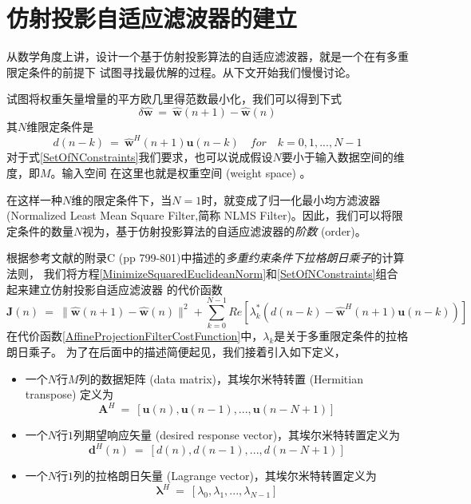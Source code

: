 \section{仿射投影自适应滤波器的建立}
从数学角度上讲，设计一个基于仿射投影算法的自适应滤波器，就是一个在有多重限定条件的前提下
试图寻找最优解的过程。从下文开始我们慢慢讨论。
\par
试图将权重矢量增量的平方欧几里得范数最小化，我们可以得到下式
\begin{equation} \label{MinimizeSquaredEuclideanNorm}
    \delta\hat{\mathbf{w}} ~=~ \hat{\mathbf{w}}(n+1) - \hat{\mathbf{w}}(n)
\end{equation}
其$N$维限定条件是
\begin{equation} \label{SetOfNConstraints}
    d(n-k) ~=~ \hat{\mathbf{w}}^{H}(n+1)\mathbf{u}(n-k)\quad for\quad k = 0,1,...,N-1
\end{equation}
对于式\eqref{SetOfNConstraints}我们要求，也可以说成假设$N$要小于输入数据空间的维度，即$M$。输入空间
在这里也就是权重空间 (weight space) 。
\par
在这样一种$N$维的限定条件下，当$N = 1$时，就变成了归一化最小均方滤波器 (Normalized Least Mean Square Filter,简称
NLMS Filter)。因此，我们可以将限定条件的数量$N$视为，基于仿射投影算法的自适应滤波器的\emph{阶数} (order)。
\par
根据参考文献的附录C (pp 799-801)中描述的\emph{多重约束条件下拉格朗日乘子}的计算法则，
我们将方程\eqref{MinimizeSquaredEuclideanNorm}和\eqref{SetOfNConstraints}组合起来建立仿射投影自适应滤波器
的代价函数
\begin{equation} \label{AffineProjectionFilterCostFunction}
    \mathbf{J}(n) ~=~ \|\hat{\mathbf{w}}(n+1) - \hat{\mathbf{w}}(n)\|^{2} + \sum^{N-1}_{k=0}Re[\lambda^{*}_{k}(d(n-k)-\hat{\mathbf{w}}^{H}(n+1)\mathbf{u}(n-k))]
\end{equation}
在代价函数\eqref{AffineProjectionFilterCostFunction}中，$\lambda_{k}$是关于多重限定条件的拉格朗日乘子。
为了在后面中的描述简便起见，我们接着引入如下定义，
\begin{itemize}
  \item 一个$N$行$M$列的数据矩阵 (data matrix)，其埃尔米特转置 (Hermitian transpose) 定义为
  \begin{equation}\label{NbyMDataMatrix}
    \mathbf{A}^{H} ~=~ [\mathbf{u}(n),\mathbf{u}(n-1),...,\mathbf{u}(n-N+1)]
  \end{equation}

  \item 一个$N$行$1$列期望响应矢量 (desired response vector)，其埃尔米特转置定义为
  \begin{equation}\label{NbyOneDesiredResponseVector}
    \mathbf{d}^{H}(n) ~=~ [d(n),d(n-1),...,d(n-N+1)]
  \end{equation}

  \item 一个$N$行$1$列的拉格朗日矢量 (Lagrange vector)，其埃尔米特转置定义为
  \begin{equation}%
    \boldsymbol{\lambda}^{H} ~=~ [\lambda_{0},\lambda_{1},...,\lambda_{N-1}]
  \end{equation}

\end{itemize}
